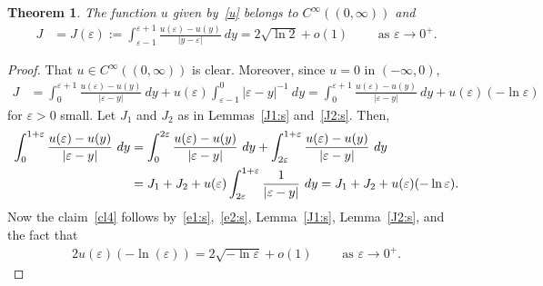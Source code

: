 \documentclass[11pt]{article}
\newcommand{\eps}{{\varepsilon}}
\numberwithin{equation}{section}
\newtheorem{theorem}{Theorem}[section]
\begin{document}
\begin{theorem}\label{thm:bdry:s} The function $u$ given by~\eqref{u} belongs to $C^\infty((0,\infty))$ and
\begin{align}\label{cl4}
J&=J(\eps):=\int^{\eps+1}_{\eps-1} \frac{u(\eps)-u(y)}{|y-\eps|}\ dy = 2\sqrt{\ln 2}+o(1)\qquad \text{ as }\eps\to 0^+.
\end{align}
\end{theorem}
\begin{proof}
That $u\in C^\infty((0,\infty))$ is clear. Moreover, since $u=0$ in $(-\infty,0)$,
\begin{align}
J&=\int^{\eps+1}_{0} \frac{u(\eps)-u(y)}{|\eps-y|}\ dy
+u(\eps)\int^{0}_{\eps-1}|\eps-y|^{-1}\ dy=\int^{\eps+1}_{0} \frac{u(\eps)-u(y)}{|\eps-y|}\ dy
+u(\eps)(-\ln \eps)\label{e1:s}
\end{align}
for $\eps>0$ small.  Let $J_1$ and $J_2$ as in Lemmas~\ref{J1:s} and~\ref{J2:s}. Then,
\begin{align}
\int_{0}^{1+\eps} \frac{u(\eps)-u(y)}{|\eps-y|}\ dy
&=
\int_{0}^{2\eps} \frac{u(\eps)-u(y)}{|\eps-y|}\ dy
+
\int_{2\eps}^{1+\eps} \frac{u(\eps)-u(y)}{|\eps-y|}\ dy\notag\\
&=J_1+J_2+u(\eps)\int_{2\eps}^{1+\eps} \frac{1}{|\eps-y|}\ dy
=J_1+J_2+u(\eps)(-\ln \eps).\label{e2:s}
\end{align}
Now the claim~\eqref{cl4} follows by~\eqref{e1:s},~\eqref{e2:s}, Lemma~\ref{J1:s}, Lemma~\ref{J2:s}, and the fact that
\begin{align*}
2u(\eps)(-\ln(\eps))=2\sqrt{-\ln \eps}+o(1)\qquad \text{ as $\eps\to 0^+$.}
\end{align*}
\end{proof}
 
\end{document}
